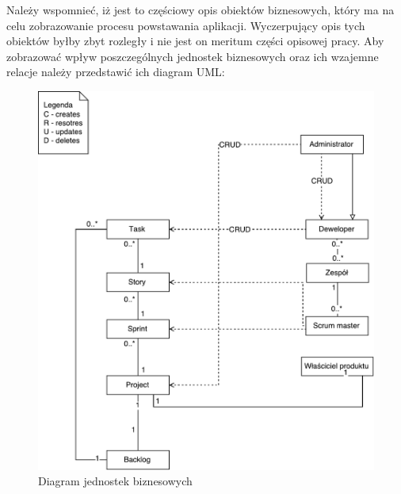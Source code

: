 Należy wspomnieć, iż jest to częściowy opis obiektów biznesowych, który ma na celu zobrazowanie procesu powstawania aplikacji. Wyczerpujący opis tych obiektów byłby zbyt rozległy i nie jest on meritum części opisowej pracy. Aby zobrazować wpływ poszczególnych jednostek biznesowych oraz ich wzajemne relacje należy przedstawić ich diagram UML:
\begin{figure}[h!]
	\centering
	\includegraphics[width=15cm]{rysunki/diaguml.pdf}	
	\caption{Diagram jednostek biznesowych}
	\label{fig:diaguml}
\end{figure}

